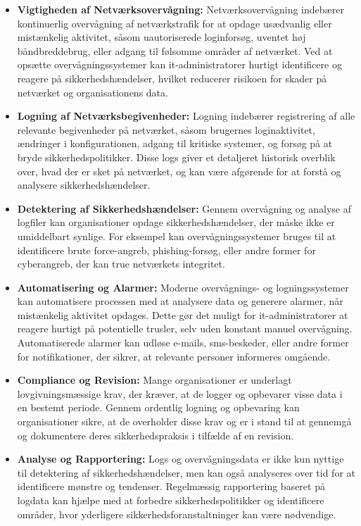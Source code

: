 \begin{itemize}
	\item \textbf{Vigtigheden af Netværksovervågning:} Netværksovervågning indebærer kontinuerlig overvågning af netværkstrafik for at opdage usædvanlig eller mistænkelig aktivitet, såsom uautoriserede loginforsøg, uventet høj båndbreddebrug, eller adgang til følsomme områder af netværket. Ved at opsætte overvågningssystemer kan it-administratorer hurtigt identificere og reagere på sikkerhedshændelser, hvilket reducerer risikoen for skader på netværket og organisationens data.
	
	\item \textbf{Logning af Netværksbegivenheder:} Logning indebærer registrering af alle relevante begivenheder på netværket, såsom brugernes loginaktivitet, ændringer i konfigurationen, adgang til kritiske systemer, og forsøg på at bryde sikkerhedspolitikker. Disse logs giver et detaljeret historisk overblik over, hvad der er sket på netværket, og kan være afgørende for at forstå og analysere sikkerhedshændelser.
	
	\item \textbf{Detektering af Sikkerhedshændelser:} Gennem overvågning og analyse af logfiler kan organisationer opdage sikkerhedshændelser, der måske ikke er umiddelbart synlige. For eksempel kan overvågningssystemer bruges til at identificere brute force-angreb, phishing-forsøg, eller andre former for cyberangreb, der kan true netværkets integritet.
	
	\item \textbf{Automatisering og Alarmer:} Moderne overvågnings- og logningssystemer kan automatisere processen med at analysere data og generere alarmer, når mistænkelig aktivitet opdages. Dette gør det muligt for it-administratorer at reagere hurtigt på potentielle trusler, selv uden konstant manuel overvågning. Automatiserede alarmer kan udløse e-mails, sms-beskeder, eller andre former for notifikationer, der sikrer, at relevante personer informeres omgående.
	
	\item \textbf{Compliance og Revision:} Mange organisationer er underlagt lovgivningsmæssige krav, der kræver, at de logger og opbevarer visse data i en bestemt periode. Gennem ordentlig logning og opbevaring kan organisationer sikre, at de overholder disse krav og er i stand til at gennemgå og dokumentere deres sikkerhedspraksis i tilfælde af en revision.
	
	\item \textbf{Analyse og Rapportering:} Logs og overvågningsdata er ikke kun nyttige til detektering af sikkerhedshændelser, men kan også analyseres over tid for at identificere mønstre og tendenser. Regelmæssig rapportering baseret på logdata kan hjælpe med at forbedre sikkerhedspolitikker og identificere områder, hvor yderligere sikkerhedsforanstaltninger kan være nødvendige.
	

\end{itemize}
